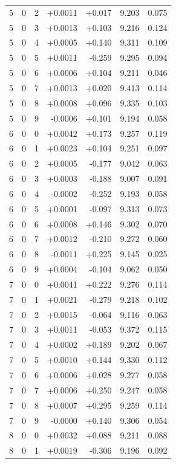 \documentclass[10pt]{article}
\begin{document}
\begin{longtable}{llrrrrr}
5 & 0 & 2 & +0.0011 & +0.017 & 9.203 & 0.075 \\
5 & 0 & 3 & +0.0013 & +0.103 & 9.216 & 0.124 \\
5 & 0 & 4 & +0.0005 & +0.140 & 9.311 & 0.109 \\
5 & 0 & 5 & +0.0011 & -0.259 & 9.295 & 0.094 \\
5 & 0 & 6 & +0.0006 & +0.104 & 9.211 & 0.046 \\
5 & 0 & 7 & +0.0013 & +0.020 & 9.413 & 0.114 \\
5 & 0 & 8 & +0.0008 & +0.096 & 9.335 & 0.103 \\
5 & 0 & 9 & -0.0006 & +0.101 & 9.194 & 0.058 \\
6 & 0 & 0 & +0.0042 & +0.173 & 9.257 & 0.119 \\
6 & 0 & 1 & +0.0023 & +0.104 & 9.251 & 0.097 \\
6 & 0 & 2 & +0.0005 & -0.177 & 9.042 & 0.063 \\
6 & 0 & 3 & +0.0003 & -0.188 & 9.007 & 0.091 \\
6 & 0 & 4 & -0.0002 & -0.252 & 9.193 & 0.058 \\
6 & 0 & 5 & +0.0001 & -0.097 & 9.313 & 0.073 \\
6 & 0 & 6 & +0.0008 & +0.146 & 9.302 & 0.070 \\
6 & 0 & 7 & +0.0012 & -0.210 & 9.272 & 0.060 \\
6 & 0 & 8 & -0.0011 & +0.225 & 9.145 & 0.025 \\
6 & 0 & 9 & +0.0004 & -0.104 & 9.062 & 0.050 \\
7 & 0 & 0 & +0.0041 & +0.222 & 9.276 & 0.114 \\
7 & 0 & 1 & +0.0021 & -0.279 & 9.218 & 0.102 \\
7 & 0 & 2 & +0.0015 & -0.064 & 9.116 & 0.063 \\
7 & 0 & 3 & +0.0011 & -0.053 & 9.372 & 0.115 \\
7 & 0 & 4 & +0.0002 & +0.189 & 9.202 & 0.067 \\
7 & 0 & 5 & +0.0010 & +0.144 & 9.330 & 0.112 \\
7 & 0 & 6 & +0.0006 & +0.028 & 9.277 & 0.058 \\
7 & 0 & 7 & +0.0006 & +0.250 & 9.247 & 0.058 \\
7 & 0 & 8 & +0.0007 & +0.295 & 9.259 & 0.114 \\
7 & 0 & 9 & -0.0000 & +0.140 & 9.306 & 0.054 \\
8 & 0 & 0 & +0.0032 & +0.088 & 9.211 & 0.088 \\
8 & 0 & 1 & +0.0019 & -0.306 & 9.196 & 0.092 \\

\end{longtable}
\end{document}
